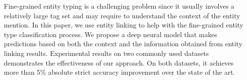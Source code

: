 Fine-grained entity typing is a challenging problem since it usually involves a relatively large tag set and may require to understand the context of the entity mention.
In this paper, we use entity linking to help with the fine-grained entity type classification process. We propose a deep neural model that makes predictions based on both the context and the information obtained from entity linking results. Experimental results on two commonly used datasets demonstrates the effectiveness of our approach. On both datasets, it achieves more than 5\% absolute strict accuracy improvement over the state of the art.